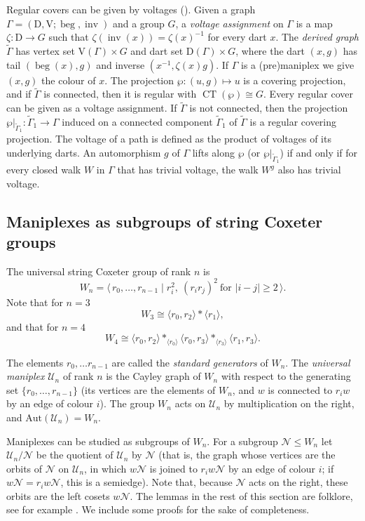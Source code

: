 \documentclass{amsart}
\theoremstyle{plain}
\theoremstyle{definition}
\theoremstyle{remark}
\newcommand{\V}{\mathrm{V}}
\newcommand{\U}{\mathcal U}
\newcommand{\N}{\mathcal N}
\newcommand{\Aut}{\mathrm{Aut}}
\DeclareMathOperator{\CT}{CT}
\DeclareMathOperator{\beg}{beg}
\DeclareMathOperator{\inv}{inv}
\begin{document}
Regular covers can be given by voltages (\cite{Gross1974, GrossTucker1977, Malnic1998, MalnicNedelaSkoviera2000}). Given a graph $\Gamma=(\mathrm{D},\V;\beg,\inv)$  and a group
$G$, a \emph{voltage assignment} on $\Gamma$ is a map $\zeta: \mathrm{D} \rightarrow G$ 
such that $\zeta(\inv(x))=\zeta(x)^{-1}$ for every dart $x$. The \emph{derived graph} $\tilde \Gamma$ has
vertex set $\V(\Gamma)\times G$ and dart set $\mathrm{D}(\Gamma)\times G$, where the dart
$(x,g)$ has tail $(\beg(x),g)$ and inverse $(x^{-1},\zeta(x)g)$. If $\Gamma$ is a
(pre)maniplex we give $(x,g)$ the colour of $x$. The projection $\wp:(u,g)\mapsto u$ is a covering projection,
and if $\tilde \Gamma$ is connected, then it is regular with $\CT(\wp)\cong G$. Every regular cover can be given as a voltage assignment.
If $\tilde \Gamma$ is not connected,
then the projection $\wp|_{\tilde\Gamma_1}:\tilde\Gamma_1 \rightarrow \Gamma$
induced on a connected component $\tilde\Gamma_1$ of $\tilde\Gamma$ is a regular covering projection.
The voltage of a path is defined as the product of voltages of its underlying darts.
An automorphism $g$ of $\Gamma$ lifts along $\wp$ (or $\wp|_{\tilde\Gamma_1}$) if and only if for every closed walk $W$ in $\Gamma$ that has trivial voltage,
the walk $W^g$ also has trivial voltage.


\subsection{Maniplexes as subgroups of string Coxeter groups}\label{sec:quotients} 

The universal string Coxeter group of rank $n$ is
\[
	W_n = \langle\, r_0,\dots,r_{n-1} \mid r_i^2,\ (r_ir_j)^2 \ \text{for } |i-j|\ge2 \,\rangle .
\]
Note that for $n=3$
\[
	W_3 \cong \langle r_0,r_2\rangle *\langle r_1\rangle,
\]
and that for $n=4$
\[
	W_4 \cong \langle r_0,r_2\rangle *_{\langle r_0\rangle} \langle r_0,r_3\rangle
		*_{\langle r_3\rangle} \langle r_1,r_3\rangle .
\]

The elements $r_0, \ldots r_{n-1}$ are called the \emph{standard generators} of $W_n$.
The \emph{universal maniplex} $\U_n$ of rank $n$ is the Cayley graph of $W_n$ with respect
to the generating set $\{r_0,\dots,r_{n-1}\}$ (its vertices are the elements of $W_n$, and
$w$ is connected to $r_iw$ by an edge of colour $i$). 
The group $W_n$ acts on $\U_n$ by multiplication on the
right, and $\Aut(\U_n)=W_n$.

Maniplexes can be studied as subgroups of $W_n$.
For a subgroup $\N\le W_n$ let $\U_n/\N$ be the quotient of $\U_n$ by $\N$ 
(that is, the graph whose vertices are the
orbits of $\N$ on $\U_n$, in which $w\N$ is joined to $r_iw\N$ by an edge of
colour $i$; if $w\N=r_iw\N$, this is a semiedge). Note that, because $\N$ acts on the right, these orbits are the left cosets $w\N$.
The lemmas in the rest of this section are folklore, see for example
 \cite{HubardToledo2023,JonesSingerman1978,HubardMochanMontero2025,Orbanic2007,Malnic1998}.
We include some proofs for the sake of completeness.
\end{document}
